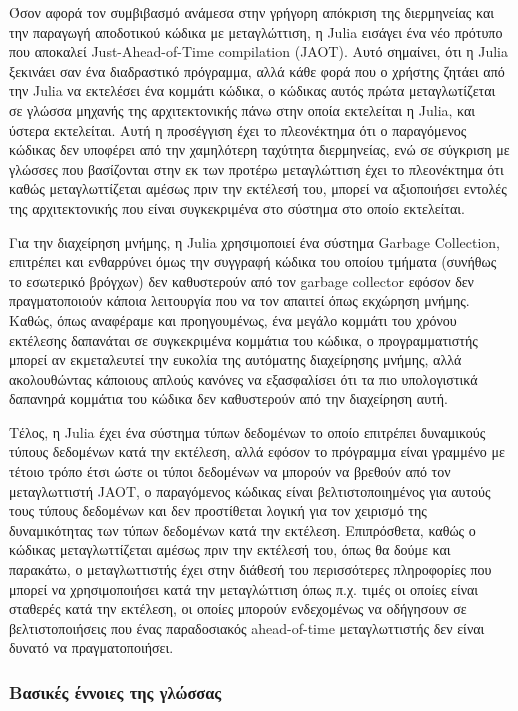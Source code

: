 Όσον αφορά τον συμβιβασμό ανάμεσα στην γρήγορη απόκριση της διερμηνείας και την παραγωγή αποδοτικού κώδικα με μεταγλώττιση, η Julia εισάγει ένα νέο πρότυπο που αποκαλεί Just-Ahead-of-Time compilation (JAOT).
Αυτό σημαίνει, ότι η Julia ξεκινάει σαν ένα διαδραστικό πρόγραμμα, αλλά κάθε φορά που ο χρήστης ζητάει από την Julia να εκτελέσει ένα κομμάτι κώδικα, ο κώδικας αυτός πρώτα μεταγλωτίζεται σε γλώσσα μηχανής της αρχιτεκτονικής πάνω στην οποία εκτελείται η Julia, και ύστερα εκτελείται.
Αυτή η προσέγγιση έχει το πλεονέκτημα ότι ο παραγόμενος κώδικας δεν υποφέρει από την χαμηλότερη ταχύτητα διερμηνείας, ενώ σε σύγκριση με γλώσσες που βασίζονται στην εκ των προτέρω μεταγλώττιση έχει το πλεονέκτημα ότι καθώς μεταγλωττίζεται αμέσως πριν την εκτέλεσή του, μπορεί να αξιοποιήσει εντολές της αρχιτεκτονικής που είναι συγκεκριμένα στο σύστημα στο οποίο εκτελείται.

Για την διαχείρηση μνήμης, η Julia χρησιμοποιεί ένα σύστημα Garbage Collection, επιτρέπει και ενθαρρύνει όμως την συγγραφή κώδικα του οποίου τμήματα (συνήθως το εσωτερικό βρόγχων) δεν καθυστερούν από τον garbage collector εφόσον δεν πραγματοποιούν κάποια λειτουργία που να τον απαιτεί όπως εκχώρηση μνήμης.
Καθώς, όπως αναφέραμε και προηγουμένως, ένα μεγάλο κομμάτι του χρόνου εκτέλεσης δαπανάται σε συγκεκριμένα κομμάτια του κώδικα, ο προγραμματιστής μπορεί αν εκμεταλευτεί την ευκολία της αυτόματης διαχείρησης μνήμης, αλλά ακολουθώντας κάποιους απλούς κανόνες να εξασφαλίσει ότι τα πιο υπολογιστικά δαπανηρά κομμάτια του κώδικα δεν καθυστερούν από την διαχείρηση αυτή.

Τέλος, η Julia έχει ένα σύστημα τύπων δεδομένων το οποίο επιτρέπει δυναμικούς τύπους δεδομένων κατά την εκτέλεση, αλλά εφόσον το πρόγραμμα είναι γραμμένο με τέτοιο τρόπο έτσι ώστε οι τύποι δεδομένων να μπορούν να βρεθούν από τον μεταγλωττιστή JAOT, ο παραγόμενος κώδικας είναι βελτιστοποιημένος για αυτούς τους τύπους δεδομένων και δεν προστίθεται λογική για τον χειρισμό της δυναμικότητας των τύπων δεδομένων κατά την εκτέλεση.
Επιπρόσθετα, καθώς ο κώδικας μεταγλωττίζεται αμέσως πριν την εκτέλεσή του, όπως θα δούμε και παρακάτω, ο μεταγλωττιστής έχει στην διάθεσή του περισσότερες πληροφορίες που μπορεί να χρησιμοποιήσει κατά την μεταγλώττιση όπως π.χ. τιμές οι οποίες είναι σταθερές κατά την εκτέλεση, οι οποίες μπορούν ενδεχομένως να οδήγησουν σε βελτιστοποιήσεις που ένας παραδοσιακός ahead-of-time μεταγλωττιστής δεν είναι δυνατό να πραγματοποιήσει.

\subsubsection{Βασικές έννοιες της γλώσσας}

